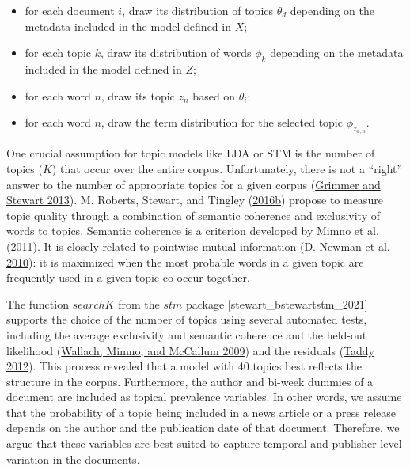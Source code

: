 \documentclass[
  12pt,
]{article}
\providecommand{\tightlist}{%
  \setlength{\itemsep}{0pt}\setlength{\parskip}{0pt}}
\begin{document}
\begin{itemize}
\tightlist
\item
  for each document \(i\), draw its distribution of topics \(\theta_d\)
  depending on the metadata included in the model defined in \(X\);
\item
  for each topic \(k\), draw its distribution of words \(\phi_k\)
  depending on the metadata included in the model defined in \(Z\);
\item
  for each word \(n\), draw its topic \(z_n\) based on \(\theta_i\);
\item
  for each word \(n\), draw the term distribution for the selected topic
  \(\phi_{z_{d,n}}\).
\end{itemize}

One crucial assumption for topic models like LDA or STM is the number of
topics (\(K\)) that occur over the entire corpus. Unfortunately, there
is not a ``right'' answer to the number of appropriate topics for a
given corpus (\protect\hyperlink{ref-grimmer_text_2013}{Grimmer and
Stewart 2013}). M. Roberts, Stewart, and Tingley
(\protect\hyperlink{ref-roberts_stm:_2016}{2016b}) propose to measure
topic quality through a combination of semantic coherence and
exclusivity of words to topics. Semantic coherence is a criterion
developed by Mimno et al.
(\protect\hyperlink{ref-mimno_optimizing_2011}{2011}). It is closely
related to pointwise mutual information
(\protect\hyperlink{ref-newman_automatic_2010}{D. Newman et al. 2010}):
it is maximized when the most probable words in a given topic are
frequently used in a given topic co-occur together.

The function \(searchK\) from the \(stm\) package
{[}stewart\_bstewartstm\_2021{]} supports the choice of the number of
topics using several automated tests, including the average exclusivity
and semantic coherence and the held-out likelihood
(\protect\hyperlink{ref-wallach_rethinking_2009}{Wallach, Mimno, and
McCallum 2009}) and the residuals
(\protect\hyperlink{ref-taddy_estimation_2012}{Taddy 2012}). This
process revealed that a model with 40 topics best reflects the structure
in the corpus. Furthermore, the author and bi-week dummies of a document
are included as topical prevalence variables. In other words, we assume
that the probability of a topic being included in a news article or a
press release depends on the author and the publication date of that
document. Therefore, we argue that these variables are best suited to
capture temporal and publisher level variation in the documents.
\end{document}
